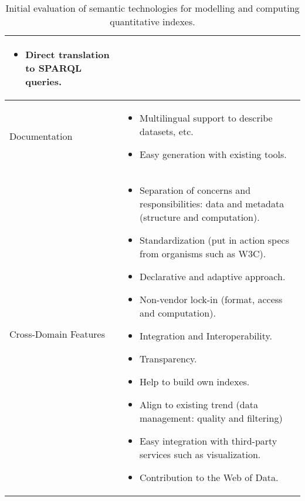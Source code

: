 \begin{table}[!htb]
\begin{center}
\begin{tabular}{|p{3cm}|p{8cm}|}
\begin{itemize}
                  \item Direct translation to SPARQL queries.  
                 \end{itemize} \\ \hline
  Documentation & \begin{itemize}
                  \item Multilingual support to describe datasets, etc.
                  \item Easy generation with existing tools.                
                 \end{itemize} \\ \hline               
  \hline
   Cross-Domain Features & \begin{itemize}
                  \item Separation of concerns and responsibilities: data and metadata (structure and computation).
                  \item Standardization (put in action specs from organisms such as W3C).
                  \item Declarative and adaptive approach.
                  \item Non-vendor lock-in (format, access and computation).
                  \item Integration and Interoperability.
                  \item Transparency.
                  \item Help to build own indexes.
                  \item Align to existing trend (data management: quality and filtering)
                  \item Easy integration with third-party services such as visualization.
                  \item Contribution to the Web of Data.
                 \end{itemize} \\ \hline              
  \hline
  \end{tabular}
  \caption{Initial evaluation of semantic technologies for modelling and computing quantitative indexes.}
  \label{tab:eval-rdfindex}
  \end{center}
\end{table} 


 